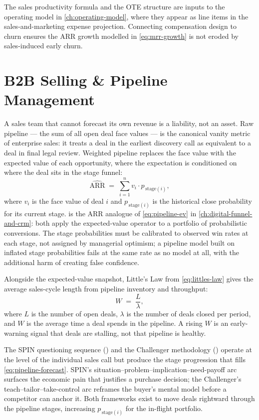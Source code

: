 The sales productivity formula and the OTE structure are inputs to the operating model in
\cref{ch:operating-model}, where they appear as line items in the sales-and-marketing
expense projection. Connecting compensation design to churn ensures the ARR growth modelled
in \cref{eq:mrr-growth} is not eroded by sales-induced early churn.


\section{B2B Selling \& Pipeline Management}\label{sec:b2b-selling}

A sales team that cannot forecast its own revenue is a liability, not an asset. Raw pipeline
--- the sum of all open deal face values --- is the canonical vanity metric of enterprise
sales: it treats a deal in the earliest discovery call as equivalent to a deal in final legal
review. Weighted pipeline replaces the face value with the expected value of each
opportunity, where the expectation is conditioned on where the deal sits in the stage
funnel:
\begin{equation}\label{eq:pipeline-forecast}
  \widehat{\text{ARR}} \;=\; \sum_{i=1}^{n} v_i \cdot p_{\,\text{stage}(i)},
\end{equation}
where \(v_i\) is the face value of deal \(i\) and \(p_{\,\text{stage}(i)}\) is the
historical close probability for its current stage.  is the
ARR analogue of \cref{eq:pipeline-ev} in \cref{ch:digital-funnel-and-crm}: both apply the
expected-value operator to a portfolio of probabilistic conversions. The stage probabilities
must be calibrated to observed win rates at each stage, not assigned by managerial optimism;
a pipeline model built on inflated stage probabilities fails at the same rate as no model at
all, with the additional harm of creating false confidence.

Alongside the expected-value snapshot, Little's Law from \cref{eq:littles-law} gives the
average sales-cycle length from pipeline inventory and throughput:
\[
  W \;=\; \frac{L}{\lambda},
\]
where \(L\) is the number of open deals, \(\lambda\) is the number of deals closed per
period, and \(W\) is the average time a deal spends in the pipeline. A rising
\(W\) is an early-warning signal that deals are stalling, not that pipeline is healthy.

The SPIN questioning sequence (\textcite{rackham1988spin}) and the Challenger methodology
(\textcite{dixon2011challenger}) operate at the level of the individual sales call but
produce the stage progression that fills \cref{eq:pipeline-forecast}. SPIN's
situation--problem--implication--need-payoff arc surfaces the economic pain that justifies
a purchase decision; the Challenger's teach--tailor--take-control arc reframes the buyer's
mental model before a competitor can anchor it. Both frameworks exist to move deals
rightward through the pipeline stages, increasing \(p_{\,\text{stage}(i)}\) for the
in-flight portfolio.

